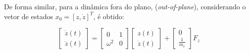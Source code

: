 De forma similar, para a dinâmica fora do plano, (\textit{out-of-plane}), considerando o vetor de estados $x_0 = [z, \dot{z}]^T$, é obtido:


\begin{equation}
    \label{eq:outofplaneZ_NASA}
\begin{bmatrix}
\dot{z}(t) \\
\ddot{z}(t)
\end{bmatrix}
=
\begin{bmatrix}
0 & 1 \\
\omega^2 & 0
\end{bmatrix}
\begin{bmatrix}
z(t) \\
\dot{z}(t)
\end{bmatrix}
+
\begin{bmatrix}
0 \\
\frac{1}{m_c}
\end{bmatrix}
F_z
\end{equation}



